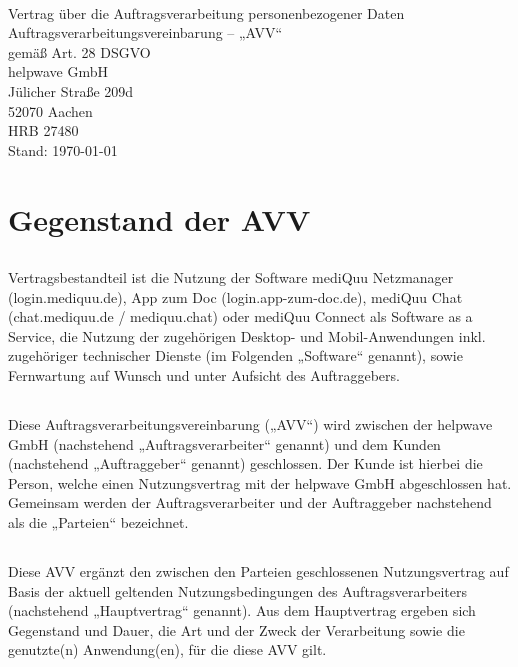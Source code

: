 \documentclass[10pt]{article}
\begin{document}
\begin{center}
	\\[4ex]
	{\huge \sffamily Vertrag über die Auftragsverarbeitung personenbezogener Daten \\[1ex]
	Auftragsverarbeitungsvereinbarung – „AVV“ \\
	\vspace{1em}
	\Large gemäß Art. 28 DSGVO}\\
	\vspace{1em}
	{\large
		helpwave GmbH \\
		Jülicher Straße 209d \\
		52070 Aachen \\
		HRB 27480}\\
	\vspace{1em}
	Stand: \today
\end{center}

\vspace{2ex}

\tableofcontents

\newpage

\section{Gegenstand der AVV}
\subsection{} Vertragsbestandteil ist die Nutzung der Software mediQuu Netzmanager
(login.mediquu.de), App zum Doc (login.app-zum-doc.de), mediQuu Chat
(chat.mediquu.de / mediquu.chat) oder mediQuu Connect als Software as a Service,
die Nutzung der zugehörigen Desktop- und Mobil-Anwendungen inkl. zugehöriger
technischer Dienste (im Folgenden „Software“ genannt), sowie Fernwartung auf
Wunsch und unter Aufsicht des Auftraggebers.
\subsection{} Diese Auftragsverarbeitungsvereinbarung („AVV“) wird zwischen der helpwave GmbH (nachstehend „Auftragsverarbeiter“
genannt) und dem Kunden (nachstehend „Auftraggeber“ genannt) geschlossen. Der Kunde ist hierbei die Person, welche einen Nutzungsvertrag mit der helpwave GmbH abgeschlossen hat. Gemeinsam werden der Auftragsverarbeiter und der
Auftraggeber nachstehend als die „Parteien“ bezeichnet.
\subsection{} Diese AVV ergänzt den zwischen den Parteien geschlossenen Nutzungsvertrag auf Basis der aktuell geltenden Nutzungsbedingungen des Auftragsverarbeiters
(nachstehend „Hauptvertrag“ genannt). Aus dem Hauptvertrag ergeben sich Gegenstand und Dauer, die Art und der Zweck der Verarbeitung sowie die genutzte(n) Anwendung(en), für die diese AVV gilt.
\end{document}
